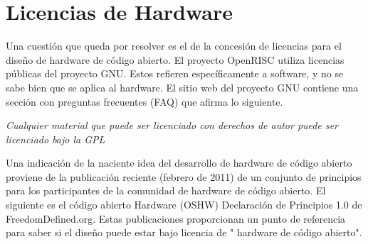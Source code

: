 
\section{Licencias de Hardware}

Una cuestión que queda por resolver es el de la concesión de licencias
para el diseño de hardware de código abierto. El proyecto OpenRISC
utiliza licencias públicas del proyecto GNU. Estos refieren
específicamente a software, y no se sabe bien que se aplica al
hardware. El sitio web del proyecto GNU contiene una sección con
preguntas frecuentes (FAQ) que afirma lo siguiente.

\textit{Cualquier material que puede ser licenciado con derechos de
autor puede ser licenciado bajo la GPL}



Una indicación de la naciente idea del desarrollo de hardware de
código abierto proviene de la publicación reciente (febrero de 2011)
de un conjunto de principios para los participantes de la comunidad de
hardware de código abierto. El siguiente es el código abierto Hardware
(OSHW) Declaración de Principios 1.0 de FreedomDefined.org. Estas
publicaciones proporcionan un punto de referencia para saber si el
diseño puede estar bajo licencia de " hardware de código abierto".

